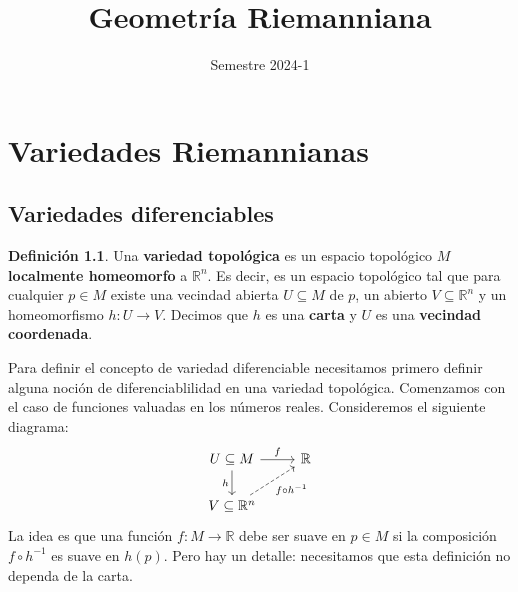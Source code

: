 \documentclass[spanish]{book}
\title{Geometría Riemanniana}
\author{Semestre 2024-1}
\renewcommand{\contentsname}{Índice}
\theoremstyle{definition}
\newtheorem*{defn}{Definición}
\newcommand{\R}{\mathbb{R}}
\begin{document}
	\maketitle
	\addcontentsline{toc}{part}{\contentsname}
	\tableofcontents
	
	\chapter{Variedades Riemannianas}
	\section{Variedades diferenciables}
	\begin{defn}
		Una \textbf{variedad topológica} es un espacio topológico $M$ \textbf{localmente homeomorfo} a $\R^n$. Es decir, es un espacio topológico tal que para cualquier $p\in M$ existe una vecindad abierta $U\subseteq M$ de $p$, un abierto $V\subseteq\R^n$ y un  homeomorfismo $h:U\to V$. Decimos que $h$ es una \textbf{carta} y $U$ es una \textbf{vecindad coordenada}.
	\end{defn}
	Para definir el concepto de variedad diferenciable necesitamos primero definir alguna noción de diferenciablilidad en una variedad topológica. Comenzamos con el caso de funciones valuadas en los números reales. Consideremos el siguiente diagrama:
	\[\begin{tikzcd}
		U\subseteq M\arrow{r}{f} \arrow{d}[swap]{h} & \mathbb{R} \\
		V \subseteq \mathbb{R}^n \arrow[swap,dashed]{ur}{f \circ h^{-1}} 
	\end{tikzcd}\]
	La idea es que una función $f:M\to\R$ debe ser suave en $p\in M$ si la composición $f\circ h^{-1}$ es suave en $h(p)$. Pero hay un detalle: necesitamos que esta definición no dependa de la carta.
	
\end{document}
